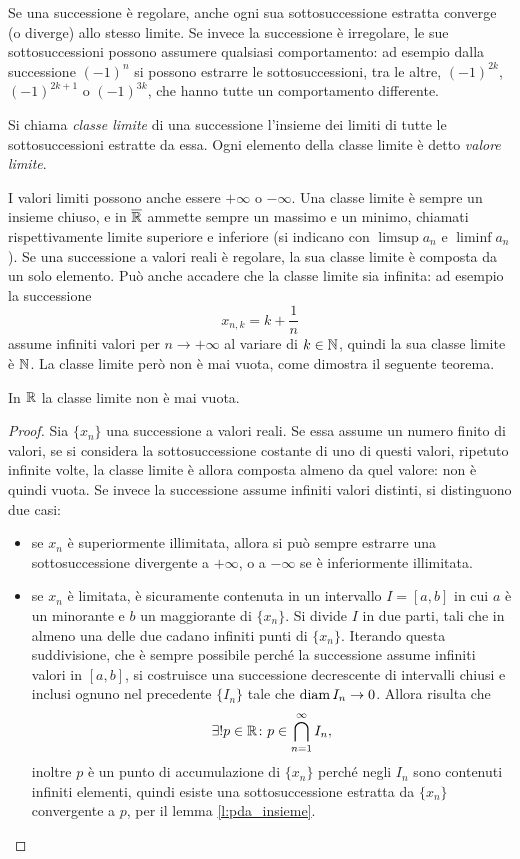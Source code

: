 Se una successione è regolare, anche ogni sua sottosuccessione estratta converge (o diverge) allo stesso limite. Se invece la successione è irregolare, le sue sottosuccessioni possono assumere qualsiasi comportamento: ad esempio dalla successione $(-1)^n$ si possono estrarre le sottosuccessioni, tra le altre, $(-1)^{2k}$, $(-1)^{2k+1}$ o $(-1)^{3k}$, che hanno tutte un comportamento differente.
\begin{definizione}
Si chiama \emph{classe limite} di una successione l'insieme dei limiti di tutte le sottosuccessioni estratte da essa. Ogni elemento della classe limite è detto \emph{valore limite}.
\end{definizione}
I valori limiti possono anche essere $+\infty$ o $-\infty$.
Una classe limite è sempre un insieme chiuso, e in $\overline{\mathbb{R}}$ ammette sempre un massimo e un minimo, chiamati rispettivamente limite superiore e inferiore (si indicano con $\limsup a_n$ e $\liminf a_n$).
Se una successione a valori reali è regolare, la sua classe limite è composta da un solo elemento. Può anche accadere che la classe limite sia infinita: ad esempio la successione
\[
x_{n,k}=k+\frac1{n}
\]
assume infiniti valori per $n\to+\infty$ al variare di $k\in\mathbb{N}$, quindi la sua classe limite è $\mathbb{N}$.
La classe limite però non è mai vuota, come dimostra il seguente teorema.
\begin{teorema}
\label{t:classe_limite_mai_vuota}
In $\mathbb{R}$ la classe limite non è mai vuota.
\end{teorema}
\begin{proof}
Sia $\{x_n\}$ una successione a valori reali. Se essa assume un numero finito di valori, se si considera la sottosuccessione costante di uno di questi valori, ripetuto infinite volte, la classe limite è allora composta almeno da quel valore: non è quindi vuota.
Se invece la successione assume infiniti valori distinti, si distinguono due casi:
\begin{itemize}
\item se $x_n$ è superiormente illimitata, allora si può sempre estrarre una sottosuccessione divergente a $+\infty$, o a $-\infty$ se è inferiormente illimitata.
\item se $x_n$ è limitata, è sicuramente contenuta in un intervallo $I=[a,b]$ in cui $a$ è un minorante e $b$ un maggiorante di $\{x_n\}$. Si divide $I$ in due parti, tali che in almeno una delle due cadano infiniti punti di $\{x_n\}$. Iterando questa suddivisione, che è sempre possibile perché la successione assume infiniti valori in $[a,b]$, si costruisce una successione decrescente di intervalli chiusi e inclusi ognuno nel precedente $\{I_n\}$ tale che $\operatorname{diam} I_n \to 0$. Allora risulta che
\[
\exists! p\in\mathbb{R}\colon p\in\bigcap_{n=1}^{\infty} I_n,
\]
inoltre $p$ è un punto di accumulazione di $\{x_n\}$ perché negli $I_n$ sono contenuti infiniti elementi, quindi esiste una sottosuccessione estratta da $\{x_n\}$ convergente a $p$, per il lemma \ref{l:pda_insieme}.\qedhere
\end{itemize}
\end{proof}
